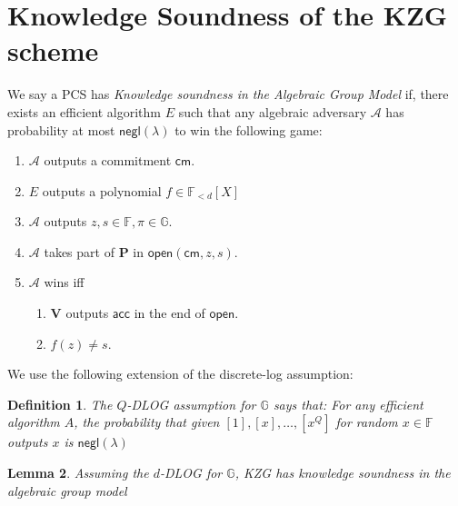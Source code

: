 \documentclass[11pt]{article} %
\newcommand{\G}{\ensuremath{{\mathbb G}}\xspace}
\newcommand{\F}{\ensuremath{\mathbb F}\xspace}
\newcommand{\adv}{\ensuremath{\mathcal A}\xspace}
\newcommand{\kzgsrs}[1]{\ensuremath{\enc{1},\enc{x},\ldots,\enc{x^{#1}}}\xspace}
\newcommand{\cm}{\ensuremath{\mathsf{cm}}\xspace}
\newcommand{\open}{\ensuremath{\mathsf{open}}\xspace}
\newcommand{\negl}{\ensuremath{\mathsf{negl}(\lambda)}\xspace}
\newcommand{\acc}{\ensuremath{\mathsf{acc}}\xspace}
\newcommand{\enc}[1]{\ensuremath{\left[#1\right]}\xspace}
\newcommand{\prv}{\ensuremath{\mathsf{\mathbf{P}}}\xspace}
\newcommand{\prf}{\ensuremath{\pi}\xspace}
\newcommand{\ver}{\ensuremath{\mathsf{\mathbf{V}}}\xspace}
\newcommand{\ext}{\ensuremath{E}\xspace}
\newcommand{\polysofdeg}[1]{\ensuremath{\F_{< #1}[X]}\xspace}
\newtheorem{lemma}{Lemma}[section]
\newtheorem{dfn}[lemma]{Definition}
\begin{document}
\section{Knowledge Soundness of the KZG scheme}
We say a PCS has \emph{Knowledge soundness in the Algebraic Group Model} if, there exists an efficient algorithm $E$
such that any algebraic adversary \adv has probability at most \negl to win the following game:
\begin{enumerate}
 \item \adv outputs a commitment \cm.
 \item \ext outputs a polynomial $f\in \polysofdeg{d}$
 \item \adv outputs $z,s\in \F,\prf\in \G$.
 \item \adv takes part of \prv in $\open(\cm,z,s)$.
 \item \adv wins iff
 \begin{enumerate}
  \item \ver outputs \acc in the end of \open.
  \item $f(z)\neq s$.
 \end{enumerate}

\end{enumerate}
We use the following extension of the discrete-log assumption:
\begin{dfn}
    The $Q$-DLOG assumption for \G says that:
    For any efficient algorithm $A$, the probability that given
    \kzgsrs{Q} for random $x\in \F$
    outputs $x$ is \negl
\end{dfn}
\begin{lemma}
 Assuming the $d$-DLOG for \G, KZG has knowledge soundness in the algebraic group model
\end{lemma}
\end{document}
